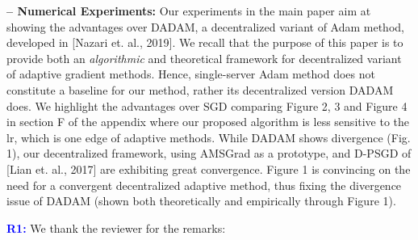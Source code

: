 \documentclass{article} %
\begin{document}
 \textbf{-- Numerical Experiments:} 
Our experiments in the main paper aim at showing the advantages over DADAM, a decentralized variant of Adam method, developed in [Nazari et. al., 2019].
We recall that the purpose of this paper is to provide both an \emph{algorithmic} and {theoretical} framework for decentralized variant of adaptive gradient methods. 
Hence, single-server Adam method does not constitute a baseline for our method, rather its decentralized version DADAM does.
We highlight the advantages over SGD comparing Figure 2, 3 and Figure 4 in section F of the appendix where our proposed algorithm is less sensitive to the lr, which is one edge of adaptive methods.
While DADAM shows divergence (Fig. 1), our decentralized framework, using AMSGrad as a prototype, and D-PSGD of [Lian et. al., 2017] are exhibiting great convergence. 
Figure 1 is convincing on the need for a convergent decentralized adaptive method, thus fixing the divergence issue of DADAM (shown both theoretically and empirically through Figure 1).

\vspace{-2pt}
\textcolor{blue}{\textbf{R1:}}
We thank the reviewer for the remarks: \vspace{-4pt}
\end{document}
